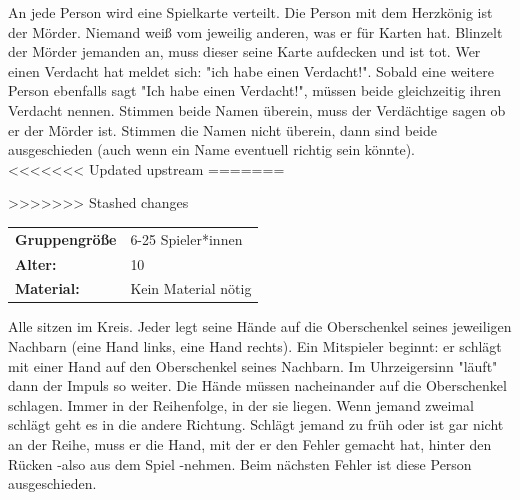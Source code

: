 An jede Person wird eine Spielkarte verteilt. Die Person mit dem Herzkönig ist der Mörder. Niemand weiß vom jeweilig anderen, was er für Karten hat. Blinzelt der Mörder jemanden an, muss dieser seine Karte aufdecken und ist tot. Wer einen Verdacht hat meldet sich: "ich habe einen Verdacht!". Sobald eine weitere Person ebenfalls sagt "Ich habe einen Verdacht!", müssen beide gleichzeitig ihren Verdacht nennen. Stimmen beide Namen überein, muss der Verdächtige sagen ob er der Mörder ist. Stimmen die Namen nicht überein, dann sind beide ausgeschieden (auch wenn ein Name eventuell richtig sein könnte). \\

<<<<<<< Updated upstream
=======

>>>>>>> Stashed changes

\begin{table}[H]
\begin{tabular}{>{\bfseries}lp{8cm}}
   Gruppengröße   & 6-25 Spieler*innen\\
    Alter: & 10 \\
    Material: & Kein Material nötig\\
\end{tabular}
\end{table} 
Alle sitzen im Kreis. Jeder legt seine Hände auf die Oberschenkel seines jeweiligen Nachbarn (eine Hand links, eine Hand rechts). Ein Mitspieler beginnt: er schlägt mit einer Hand auf den Oberschenkel seines Nachbarn. Im Uhrzeigersinn "läuft" dann der Impuls so weiter. Die Hände müssen nacheinander auf die Oberschenkel schlagen. Immer in der Reihenfolge, in der sie liegen. Wenn jemand zweimal schlägt geht es in die andere Richtung. Schlägt jemand zu früh oder ist gar nicht an der Reihe, muss er die Hand, mit der er den Fehler gemacht hat, hinter den Rücken -also aus dem Spiel -nehmen. Beim nächsten Fehler ist diese Person ausgeschieden. \\



